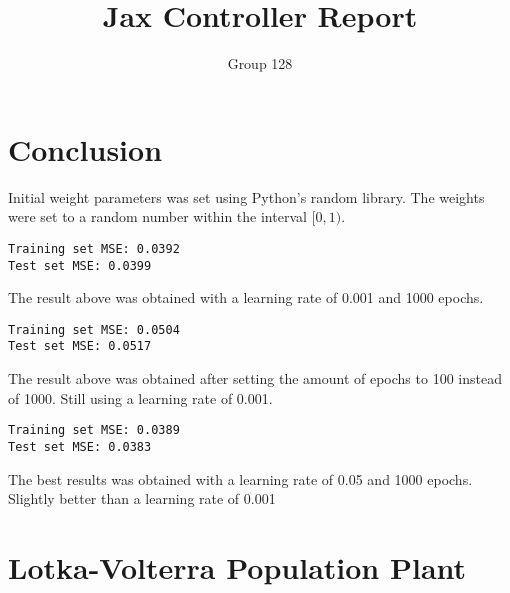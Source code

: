 \documentclass[12pt]{article}
\title{Jax Controller Report}
\author{Group 128}
\date{}
\begin{document}
\maketitle

\section*{Conclusion}

Initial weight parameters was set using Python's random library. The weights were set to a random number within the interval $[0,1)$.


\begin{verbatim}
Training set MSE: 0.0392
Test set MSE: 0.0399
\end{verbatim}

The result above was obtained with a learning rate of 0.001 and 1000 epochs. 

\begin{verbatim}
Training set MSE: 0.0504
Test set MSE: 0.0517
\end{verbatim}

The result above was obtained after setting the amount of epochs to 100 instead of 1000. Still using a learning rate of 0.001.

\begin{verbatim}
Training set MSE: 0.0389
Test set MSE: 0.0383
\end{verbatim}

The best results was obtained with a learning rate of 0.05 and 1000 epochs. Slightly better than a learning rate of
0.001

\section*{Lotka-Volterra Population Plant}



\printbibliography
\end{document}
